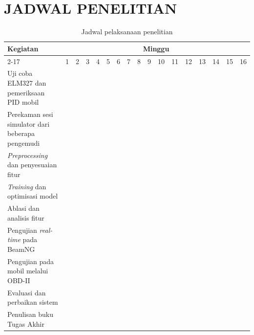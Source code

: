 \chapter{JADWAL PENELITIAN}

\newcommand{\w}{}
\newcommand{\G}{\cellcolor{gray}}
\begin{table}[H]
  \centering
  \caption{Jadwal pelaksanaan penelitian}
  \label{tbl:timeline}
  \small
  \setlength{\tabcolsep}{3pt}
  \begin{tabular}{|p{4.2cm}|c|c|c|c|c|c|c|c|c|c|c|c|c|c|c|c|}
    \hline
    \multirow{2}{*}{Kegiatan} & \multicolumn{16}{c|}{Minggu} \\
    \cline{2-17}
     & 1 & 2 & 3 & 4 & 5 & 6 & 7 & 8 & 9 & 10 & 11 & 12 & 13 & 14 & 15 & 16 \\
    \hline
    Uji coba ELM327 dan pemeriksaan PID mobil
     & \G & \G & \w & \w & \w & \w & \w & \w & \w & \w & \w & \w & \w & \w & \w & \w \\
    \hline
    Perekaman sesi simulator dari beberapa pengemudi
     & \G & \G & \G & \G & \w & \w & \w & \w & \w & \w & \w & \w & \w & \w & \w & \w \\
    \hline
    \textit{Preprocessing} dan penyesuaian fitur
     & \w & \w & \G & \G & \G & \w & \w & \w & \w & \w & \w & \w & \w & \w & \w & \w \\
    \hline
    \textit{Training} dan optimisasi model
     & \w & \w & \w & \w & \G & \G & \G & \G & \w & \w & \w & \w & \w & \w & \w & \w \\
    \hline
    Ablasi dan analisis fitur
     & \w & \w & \w & \w & \w & \w & \w & \G & \G & \w & \w & \w & \w & \w & \w & \w \\
    \hline
    Pengujian \textit{real-time} pada BeamNG
     & \w & \w & \w & \w & \w & \w & \w & \w & \G & \G & \w & \w & \w & \w & \w & \w \\
    \hline
    Pengujian pada mobil melalui OBD-II
     & \w & \w & \w & \w & \w & \w & \w & \w & \w & \w & \G & \G & \G & \w & \w & \w \\
    \hline
    Evaluasi dan perbaikan sistem
     & \w & \w & \w & \w & \w & \w & \w & \w & \w & \w & \w & \G & \G & \G & \w & \w \\
    \hline
    Penulisan buku Tugas Akhir
     & \w & \w & \w & \w & \w & \w & \w & \w & \G & \G & \G & \G & \G & \G & \G & \G \\
    \hline
  \end{tabular}
\end{table}

